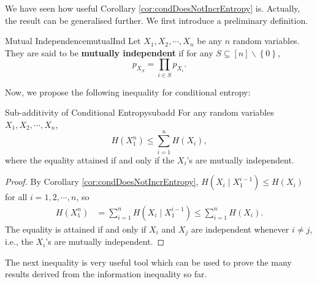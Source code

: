 \documentclass[math, code]{amznotes}
\theoremstyle{remark}
\begin{document}
We have seen how useful Corollary \ref{cor:condDoesNotIncrEntropy} is. Actually, the result can be generalised further. We first introduce a preliminary definition.
\begin{dfnbox}{Mutual Independence}{mutualInd}
    Let $X_1, X_2, \cdots, X_n$ be any $n$ random variables. They are said to be {\color{red} \textbf{mutually independent}} if for any $S \subseteq \left[n\right] \backslash \left\{0\right\}$, 
    \begin{equation*}
        p_{X_S} = \prod_{i \in S}p_{X_i}.
    \end{equation*}
\end{dfnbox}
Now, we propose the following inequality for conditional entropy:
\begin{corbox}{Sub-additivity of Conditional Entropy}{subadd}
    For any random variables $X_1, X_2, \cdots, X_n$,
    \begin{equation*}
        H\left(X_1^n\right) \leq \sum_{i = 1}^{n}H\left(X_i\right),
    \end{equation*}
    where the equality attained if and only if the $X_i$'s are mutually independent.
    \tcblower
    \begin{proof}
        By Corollary \ref{cor:condDoesNotIncrEntropy}, $H\left(X_i \mid X_1^{i - 1}\right) \leq H\left(X_i\right)$ for all $i = 1, 2, \cdots, n$, so
        \begin{align*}
            H\left(X_1^n\right) & = \sum_{i = 1}^nH\left(X_i \mid X_1^{i - 1}\right)  \leq \sum_{i = 1}^{n}H\left(X_i\right).
        \end{align*}
        The equality is attained if and only if $X_i$ and $X_j$ are independent whenever $i \neq j$, i.e., the $X_i$'s are mutually independent.
    \end{proof}
\end{corbox}
The next inequality is very useful tool which can be used to prove the many results derived from the information inequality so far.
\end{document}
